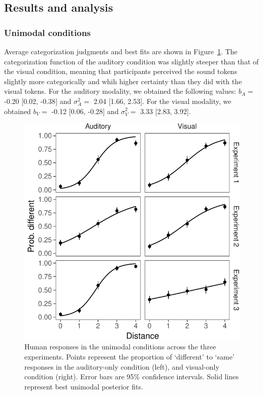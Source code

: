 \documentclass[english,floatsintext,man]{apa6}
\theoremstyle{definition}
\theoremstyle{definition}
\theoremstyle{definition}
\theoremstyle{remark}
\begin{document}
\subsection{Results and analysis}\label{results-and-analysis}

\subsubsection{Unimodal conditions}\label{unimodal-conditions-1}

Average categorization judgments and best fits are shown in
Figure~\ref{fig:unimodal}. The categorization function of the auditory
condition was slightly steeper than that of the visual condition,
meaning that participants perceived the sound tokens slightly more
categorically and whih higher certainty than they did with the visual
tokens. For the auditory modality, we obtained the following values:
\(b_A=\) -0.20 {[}0.02, -0.38{]} and \(\sigma^2_A=\) 2.04 {[}1.66,
2.53{]}. For the visual modality, we obtained \(b_V=\) -0.12 {[}0.06,
-0.28{]} and \(\sigma^2_V=\) 3.33 {[}2.83, 3.92{]}.

\begin{figure}[!h]
\includegraphics[width=\textwidth]{ms_files/figure-latex/unimodal-1} \caption{Human responses in the unimodal conditions across the three experiments. Points represent the proportion of `different' to `same' responses in the auditory-only condition (left), and visual-only condition (right). Error bars are 95\% confidence intervals. Solid lines represent best unimodal posterior fits.}\label{fig:unimodal}
\end{figure}
\end{document}
